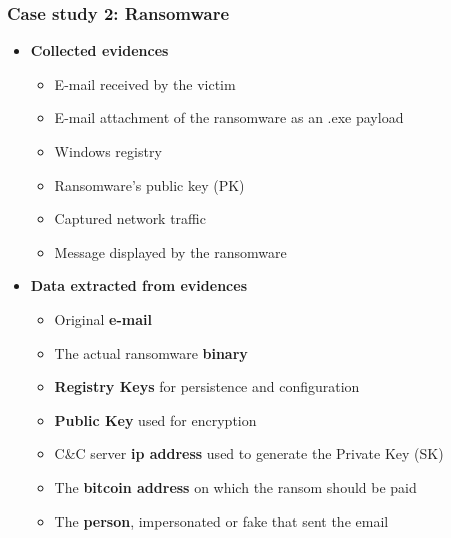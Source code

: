 \begin{frame}
    \frametitle{Case study 2: Ransomware}
    \begin{itemize}
        \item[] \textbf{Collected evidences}
        \begin{itemize}
            \item E-mail received by the victim
            \item E-mail attachment of the ransomware as an .exe payload
            \item Windows registry
            \item Ransomware's public key (PK)
            \item Captured network traffic
            \item Message displayed by the ransomware
        \end{itemize}
    \end{itemize}
    \begin{itemize}
        \item[] \textbf{Data extracted from evidences}
        \begin{itemize}
            \item Original \textbf{e-mail}
            \item The actual ransomware \textbf{binary}
            \item \textbf{Registry Keys} for persistence and configuration
            \item \textbf{Public Key} used for encryption
            \item C\&C server \textbf{ip address} used to generate the Private Key (SK)
            \item The \textbf{bitcoin address} on which the ransom should be paid
            \item The \textbf{person}, impersonated or fake that sent the email
        \end{itemize}
    \end{itemize}
\end{frame}

